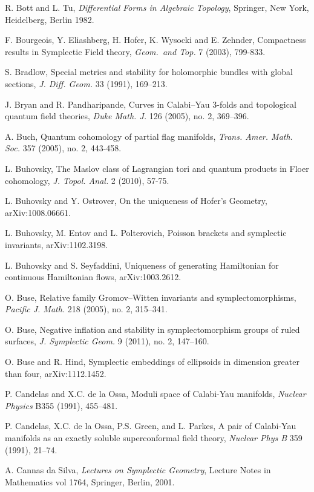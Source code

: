  R. Bott and L. Tu, \emph{Differential Forms in Algebraic Topology}, Springer, New York, Heidelberg, Berlin 1982.

 F. Bourgeois, Y. Eliashberg, H. Hofer, K. Wysocki and E. Zehnder, Compactness results in Symplectic Field theory, \emph{Geom.\ and Top.} 7 (2003), 799-833.

 S. Bradlow, Special metrics and stability for holomorphic bundles with global sections, \emph{J. Diff. Geom.} 33 (1991), 169–213.

 J. Bryan and R. Pandharipande, Curves in Calabi–Yau 3-folds and topological quantum field theories, \emph{Duke Math. J.} 126 (2005), no. 2, 369–396.

 A. Buch, Quantum cohomology of partial flag manifolds, \emph{Trans. Amer. Math. Soc.} 357 (2005), no. 2, 443-458.

 L. Buhovsky, The Maslov class of Lagrangian tori and quantum products in Floer cohomology, \emph{J. Topol. Anal.} 2 (2010), 57-75.

 L. Buhovsky and Y. Ostrover, On the uniqueness of Hofer’s Geometry, arXiv:1008.06661.

 L. Buhovsky, M. Entov and L. Polterovich, Poisson brackets and symplectic invariants, arXiv:1102.3198.

 L. Buhovsky and S. Seyfaddini, Uniqueness of generating Hamiltonian for continuous Hamiltonian flows, arXiv:1003.2612.

 O. Buse, Relative family Gromov–Witten invariants and symplectomorphisms, \emph{Pacific J. Math.} 218 (2005), no. 2, 315–341.

 O. Buse, Negative inflation and stability in symplectomorphism groups of ruled surfaces, \emph{J. Symplectic Geom.} 9 (2011), no. 2, 147–160.

 O. Buse and R. Hind, Symplectic embeddings of ellipsoids in dimension greater than four, arXiv:1112.1452.

 P. Candelas and X.C. de la Ossa, Moduli space of Calabi-Yau manifolds, \emph{Nuclear Physics} B355 (1991), 455–481.

 P. Candelas, X.C. de la Ossa, P.S. Green, and L. Parkes, A pair of Calabi-Yau manifolds as an exactly soluble superconformal field theory, \emph{Nuclear Phys B} 359 (1991), 21–74.

 A. Cannas da Silva, \emph{Lectures on Symplectic Geometry}, Lecture Notes in Mathematics vol 1764, Springer, Berlin, 2001.

